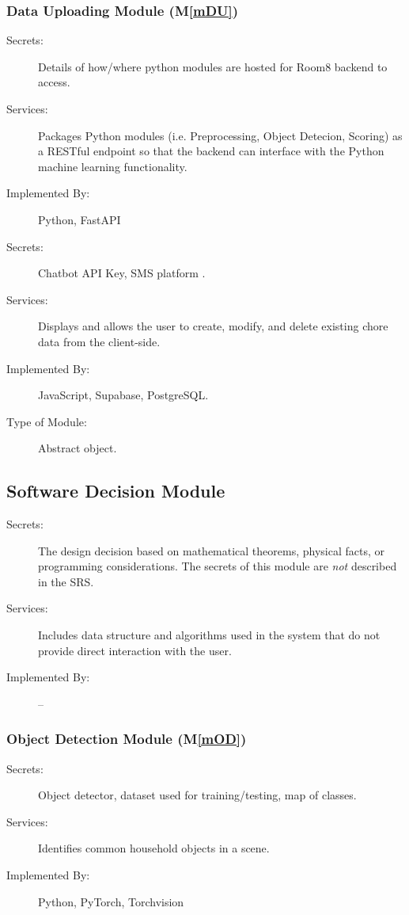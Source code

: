 \documentclass[12pt, titlepage]{article}
\newcommand{\mref}[1]{M\ref{#1}}
\begin{document}
\subsubsection{Data Uploading Module (\mref{mDU})}

\begin{description}
\item[Secrets:] Details of how/where python modules are hosted for Room8 backend to access.
\item[Services:] Packages Python modules (i.e. Preprocessing, Object Detecion, Scoring) as a RESTful endpoint so that the backend can interface with the Python machine learning functionality.
\item[Implemented By:] Python, FastAPI
\item[Secrets:]Chatbot API Key, SMS platform .
\item[Services:] Displays and allows the user to create, modify, and delete existing chore data from the client-side.
\item[Implemented By:] JavaScript, Supabase, PostgreSQL.
\item[Type of Module:] Abstract object.
\end{description}


\subsection{Software Decision Module}

\begin{description}
\item[Secrets:] The design decision based on mathematical theorems, physical
  facts, or programming considerations. The secrets of this module are
  \emph{not} described in the SRS.
\item[Services:] Includes data structure and algorithms used in the system that
  do not provide direct interaction with the user. 
\item[Implemented By:] --
\end{description}

\subsubsection{Object Detection Module (\mref{mOD})}

\begin{description}
\item[Secrets:]Object detector, dataset used for training/testing, map of classes. 
\item[Services:]Identifies common household objects in a scene.
\item[Implemented By:]Python, PyTorch, Torchvision
\end{description}
\end{document}
